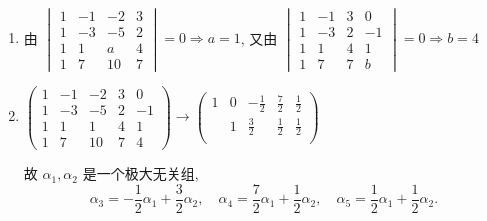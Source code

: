	 \paragraph{} %
		 \begin{enumerate}
			 \item %
			       由 \( \begin{vmatrix}
				       1 & -1 & -2 & 3 \\
				       1 & -3 & -5 & 2 \\
				       1 & 1  & a  & 4 \\
				       1 & 7  & 10 & 7
			       \end{vmatrix} = 0 \Rightarrow a = 1 \), 又由 \( \begin{vmatrix}
				       1 & -1 & 3 & 0  \\
				       1 & -3 & 2 & -1 \\
				       1 & 1  & 4 & 1  \\
				       1 & 7  & 7 & b
			       \end{vmatrix} = 0 \Rightarrow b = 4 \)
			 \item %
			       \( \begin{pmatrix}
				       1 & -1 & -2 & 3 & 0  \\
				       1 & -3 & -5 & 2 & -1 \\
				       1 & 1  & 1  & 4 & 1  \\
				       1 & 7  & 10 & 7 & 4
			       \end{pmatrix}
			       \to \begin{pmatrix}
				       1 & 0 & -\frac{1}{2} & \frac{7}{2} & \frac{1}{2} \\
				         & 1 & \frac{3}{2}  & \frac{1}{2} & \frac{1}{2} \\
				         &   &              &             &
			       \end{pmatrix} \)

			       故 \( \alpha_{1}, \alpha_{2} \) 是一个极大无关组,
			       \[ \alpha_{3} = -\frac{1}{2}\alpha_{1} + \frac{3}{2}\alpha_{2}, \quad \alpha_{4} = \frac{7}{2}\alpha_{1} + \frac{1}{2}\alpha_{2}, \quad \alpha_{5} = \frac{1}{2}\alpha_{1} + \frac{1}{2}\alpha_{2}. \]
		 \end{enumerate}

